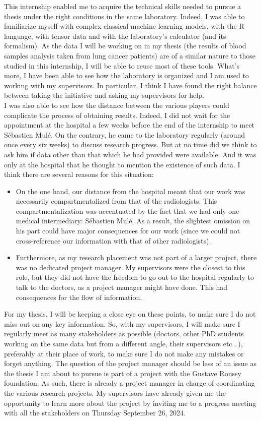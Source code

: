 \documentclass[preprint,12pt]{elsarticle}
\begin{document}
\noindent This internship enabled me to acquire the technical skills needed to pursue a thesis under the right conditions in the same laboratory. Indeed, I was able to familiarize myself with complex classical machine learning models, with the R language, with tensor data and with the laboratory's calculator (and its formalism). As the data I will be working on in my thesis (the results of blood samples analysis taken from lung cancer patients) are of a similar nature to those studied in this internship, I will be able to reuse most of these tools. What's more, I have been able to see how the laboratory is organized and I am used to working with my supervisors. In particular, I think I have found the right balance between taking the initiative and asking my supervisors for help.\\
\indent I was also able to see how the distance between the various players could complicate the process of obtaining results. Indeed, I did not wait for the appointment at the hospital a few weeks before the end of the internship to meet Sébastien Mulé. On the contrary, he came to the laboratory regularly (around once every six weeks) to discuss research progress. But at no time did we think to ask him if data other than that which he had provided were available. And it was only at the hospital that he thought to mention the existence of such data. I think there are several reasons for this situation:
\begin{itemize}[label = $\bullet$]
    \item On the one hand, our distance from the hospital meant that our work was necessarily compartmentalized from that of the radiologists. This compartmentalization was accentuated by the fact that we had only one medical intermediary: Sébastien Mulé. As a result, the slightest omission on his part could have major consequences for our work (since we could not cross-reference our information with that of other radiologists).
    \item Furthermore, as my research placement was not part of a larger project, there was no dedicated project manager. My supervisors were the closest to this role, but they did not have the freedom to go out to the hospital regularly to talk to the doctors, as a project manager might have done. This had consequences for the flow of information.
\end{itemize}
\indent For my thesis, I will be keeping a close eye on these points, to make sure I do not miss out on any key information. So, with my supervisors, I will make sure I regularly meet as many stakeholders as possible (doctors, other PhD students working on the same data but from a different angle, their supervisors etc...), preferably at their place of work, to make sure I do not make any mistakes or forget anything. The question of the project manager should be less of an issue as the thesis I am about to pursue is part of a project with the Gustave Roussy foundation. As such, there is already a project manager in charge of coordinating the various research projects. My supervisors have already given me the opportunity to learn more about the project by inviting me to a progress meeting with all the stakeholders on Thursday September 26, 2024. \\
\end{document}
